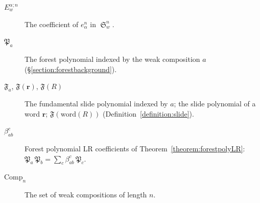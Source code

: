 \documentclass[pdflatex,sn-mathphys-num]{sn-jnl}
\numberwithin{equation}{subsection}
\DeclareMathOperator{\sch}{\mathfrak{S}}
\newcommand{\forest}{\mathfrak{P}}
\theoremstyle{thmstyleone}
\theoremstyle{thmstylethree}
\theoremstyle{thmstyletwo}
\begin{document}
\begin{appendices}
\begin{description}
\item[$E_w^{\alpha;n}$] The coefficient of $e_\alpha^n$ in $\sch_w^n$.
\item[$\forest_a$] The forest polynomial indexed by the weak composition $a$ (\S\ref{section:forestbackground}).
\item[$\mathfrak{F}_a$, $\mathfrak{F}(\mathbf r)$, $\mathfrak F(R)$] The fundamental slide polynomial indexed by $a$; the slide polynomial of a word $\mathbf r$; $\mathfrak F(\mathrm{word}(R))$ (Definition~\ref{definition:slide}).
\item[$\beta_{ab}^c$] Forest polynomial LR coefficients of Theorem~\ref{theorem:forestpolyLR}: $\forest_a\,\forest_b=\sum_c\beta_{ab}^c\,\forest_c$.
\item[$\mathrm{Comp}_n$] The set of weak compositions of length $n$.
\end{description}


\end{appendices}
\end{document}
